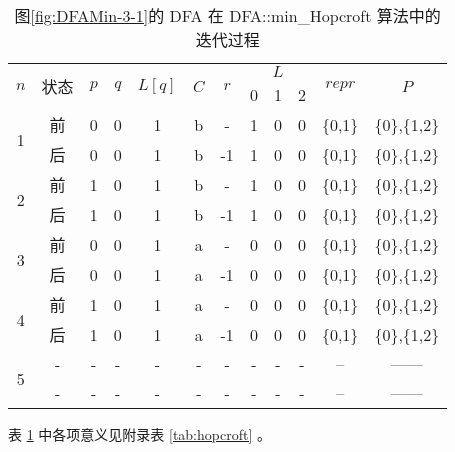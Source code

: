 \begin{table}[!htbp]
    \caption{图\ref{fig:DFAMin-3-1}的 DFA 在 DFA::min\_Hopcroft 算法中的迭代过程}
    \label{tab:hopcroftAna}
    \centering
    \small%
    \setlength{\tabcolsep}{8pt}%
    \renewcommand{\arraystretch}{1.2}%
    \begin{tabular}{ccccccc|ccc|cc} 
        \toprule%
        \multirow{2}{*}{$n$} & \multirow{2}{*}{状态} & \multirow{2}{*}{$p$} & \multirow{2}{*}{$q$} & \multirow{2}{*}{$L[q]$} & \multirow{2}{*}{$C$} & \multirow{2}{*}{$r$} & \multicolumn{3}{c|}{$L$} & \multirow{2}{*}{$repr$} & \multirow{2}{*}{$P$}  \\
        \cline{8-10}             &                   &                     &                    &                       &                   &    & 0 & 1 &2 & & \\
        \midrule%
        \multirow{2}{*}{1} & 前 & 0 & 0 & 1 & b & -  & 1 & 0 & 0 & \{0,1\} & \{0\},\{1,2\} \\
                           & 后 & 0 & 0 & 1 & b & -1 & 1 & 0 & 0 & \{0,1\} & \{0\},\{1,2\} \\
        \midrule%
        \multirow{2}{*}{2} & 前 & 1 & 0 & 1 & b & -  & 1 & 0 & 0 & \{0,1\} & \{0\},\{1,2\} \\
                           & 后 & 1 & 0 & 1 & b & -1 & 1 & 0 & 0 & \{0,1\} & \{0\},\{1,2\} \\
        \midrule%
        \multirow{2}{*}{3} & 前 & 0 & 0 & 1 & a & -  & 0 & 0 & 0 & \{0,1\} & \{0\},\{1,2\} \\
                           & 后 & 0 & 0 & 1 & a & -1 & 0 & 0 & 0 & \{0,1\} & \{0\},\{1,2\} \\
        \midrule%
        \multirow{2}{*}{4} & 前 & 1 & 0 & 1 & a & -  & 0 & 0 & 0 & \{0,1\} & \{0\},\{1,2\} \\
                           & 后 & 1 & 0 & 1 & a & -1 & 0 & 0 & 0 & \{0,1\} & \{0\},\{1,2\} \\
        \midrule%
        \multirow{2}{*}{5} & - & - & - & - & - & -  & - & - & - & -- & ------ \\
                           & - & - & - & - & - & -  & - & - & - & -- & ------ \\
        \bottomrule%
    \end{tabular}
\end{table}

表 \ref{tab:hopcroftAna} 中各项意义见附录表 \ref{tab:hopcroft} 。